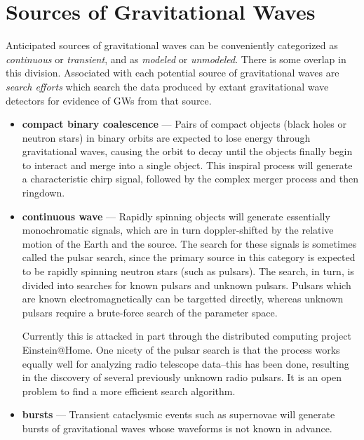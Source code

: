 \section{Sources of Gravitational Waves}
Anticipated sources of gravitational waves can be conveniently
categorized as \emph{continuous} or \emph{transient}, and as
\emph{modeled} or \emph{unmodeled}.  There is some overlap in this
division.  Associated with each potential source of gravitational
waves are \emph{search efforts} which search the data produced by
extant gravitational wave detectors for evidence of GWs from that 
source.

\begin{itemize}

\item \textbf{compact binary coalescence} --- Pairs of compact objects
  (black holes or neutron stars) in binary orbits are expected to lose
  energy through gravitational waves, causing the orbit to decay until
  the objects finally begin to interact and merge into a single
  object.  This inspiral process will generate a characteristic chirp
  signal, followed by the complex merger process and then ringdown.

\item \textbf{continuous wave} --- Rapidly spinning objects will
  generate essentially monochromatic signals, which are in turn
  doppler-shifted by the relative motion of the Earth and the source.
  The search for these signals is sometimes called the pulsar search, since the primary source
  in this category is expected to be rapidly spinning neutron stars
  (such as pulsars).  The search, in turn, is divided into searches
  for known pulsars and unknown pulsars.  Pulsars which are known
  electromagnetically can be targetted directly, whereas unknown
  pulsars require a brute-force search of the parameter space.

  Currently this is attacked in part through the distributed computing
  project Einstein@Home.  One nicety of the pulsar search is that the
  process works equally well for analyzing radio telescope data--this
  has been done, resulting in the discovery of several previously
  unknown radio pulsars\cite{Knispel2010Pulsar}.  It is an open
  problem to find a more efficient search algorithm.

\item \textbf{bursts} --- Transient cataclysmic events such as
  supernovae will generate bursts of gravitational waves whose
  waveforms is not known in advance.  


\end{itemize}
